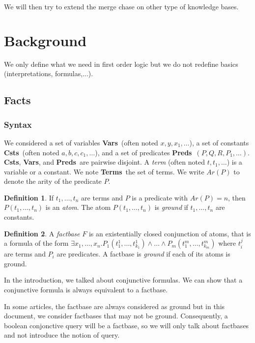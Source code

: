 \documentclass{article}
\theoremstyle{definition}
\newtheorem{definition}{Definition}[section]
\theoremstyle{remark}
\newcommand{\Vars}{\textbf{Vars}}
\newcommand{\Terms}{\textbf{Terms}}
\newcommand{\Preds}{\textbf{Preds}}
\newcommand{\Csts}{\textbf{Csts}}
\begin{document}
We will then try to extend the merge chase on other type of knowledge bases.

\tableofcontents					%
\section{Background}

We only define what we need in first order logic but we do not redefine basics (interpretations, formulas,...).

\subsection{Facts}

\subsubsection{Syntax}

We considered a set of variables \Vars\ (often noted $x,y,x_{1},\ldots$), a set of constants \Csts\ (often noted $a,b,c,c_{1},\ldots$), and a set of predicates \Preds\ $(P,Q,R,P_{1},\ldots)$. \Csts, \Vars, and \Preds\ are pairwise disjoint. A \emph{term}  (often noted $t,t_{1},\ldots$) is a variable or a constant. We note \Terms\ the set of terms. We write \emph{$\textit{Ar}(P)$} to denote the arity of the predicate $P$. 

\begin{definition}
If $t_1,\ldots,t_n$ are terms and $P$ is a predicate with $Ar(P) = n$, then $P(t_{1},\ldots,t_{n})$ is an \emph{atom}. The atom $P(t_{1},\ldots,t_{n})$ is \emph{ground} if $t_1,\ldots,t_n$ are constants.
\end{definition}

\begin{definition}
A \emph{factbase} $F$ is an existentially closed conjunction of atoms, that is a formula of the form $\exists x_{1},\ldots,x_{n}.P_{1}(t_{1}^{1},\ldots,t_{k_{1}}^{1})\land \ldots\land P_{m}(t_{1}^{m},\ldots,t_{k_{m}}^{m})$ where $t_i^j$ are terms and $P_i$ are predicates. A factbase is \emph{ground} if each of its atoms is ground.
\end{definition}

In the introduction, we talked about conjunctive formulas. We can show that a conjunctive formula is always equivalent to a factbase.

In some articles, the factbase are always considered as ground but in this document, we consider factbases that may not be ground. Consequently, a  boolean conjonctive query will be a factbase, so we will only talk about factbases and not introduce the notion of query.
\end{document}
